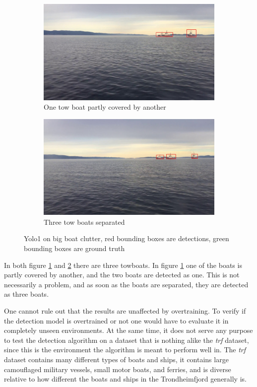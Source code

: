\begin{figure}[h!]
\begin{subfigure}{.5\textwidth}
  \centering
  \includegraphics[width=0.8\linewidth]{results/video/video3/frame479.jpg}
  \caption{One tow boat partly covered by another}
  \label{fig:yolo1_clut_tow}
\end{subfigure}%
\begin{subfigure}{.5\textwidth}
  \centering
  \includegraphics[width=.8\linewidth]{results/video/video3/frame677.jpg}
  \caption{Three tow boats separated}
  \label{fig:yolo1_sep}
\end{subfigure}
\caption{Yolo1 on big boat clutter, red bounding boxes are detections, green bounding boxes are ground truth}
\label{fig:yolo1_clutter}
\end{figure}

In both figure \ref{fig:yolo1_clut_tow} and \ref{fig:yolo1_sep} there are three towboats. In figure \ref{fig:yolo1_clut_tow} one of the boats is partly covered by another, and the two boats are detected as one. This is not necessarily a problem, and as soon as the boats are separated, they are detected as three boats. 

\vspace{3mm}

One cannot rule out that the results are unaffected by overtraining. To verify if the detection model is overtrained or not one would have to evaluate it in completely unseen environments. At the same time, it does not serve any purpose to test the detection algorithm on a dataset that is nothing alike the \textit{trf} dataset, since this is the environment the algorithm is meant to perform well in. The \textit{trf} dataset contains many different types of boats and ships, it contains large camouflaged military vessels, small motor boats, and ferries, and is diverse relative to how different the boats and ships in the Trondheimfjord generally is. 

